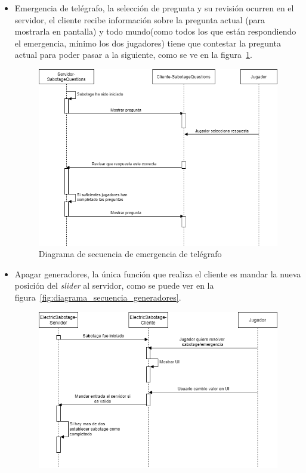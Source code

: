 \begin{itemize}
    \item Emergencia de telégrafo, la selección de pregunta y su revisión ocurren en el servidor, el cliente recibe información sobre la pregunta actual (para mostrarla en pantalla) y todo mundo(como todos los que están respondiendo el emergencia, mínimo los dos jugadores) tiene que contestar la pregunta actual para poder pasar a la siguiente, como se ve en la figura~\ref{fig:diagrama_secuencia_emergencia_pregunta}.
        \begin{figure}[h]
            \centering
            \includegraphics[width=1\linewidth]{images/diagrama_secuencia_sabotage_preguntas.png}
            \caption{Diagrama de secuencia de emergencia de telégrafo}
            \label{fig:diagrama_secuencia_emergencia_pregunta}
        \end{figure}
    \item Apagar generadores, la única función que realiza el cliente es mandar la nueva posición del \textit{slider} al servidor, como se puede ver en la figura~\ref{fig:diagrama_secuencia_generadores}.
        \begin{figure}[h]
            \centering
            \includegraphics[width=1\linewidth]{images/DiagramaSecuenciaSabotageGeneradores.png}

\end{figure}
\end{itemize}
